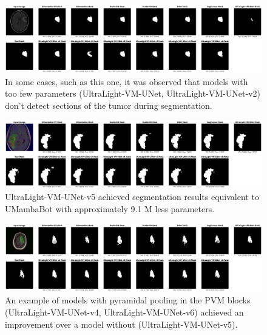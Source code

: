 \documentclass[conference]{IEEEtran}
\begin{document}
\begin{figure}[!h]
    \centering
    \includegraphics[width=\textwidth]{imgs/13_4.png}
    \caption{In some cases, such as this one, it was observed that models with too few parameters (UltraLight-VM-UNet, UltraLight-VM-UNet-v2) don't detect sections of the tumor during segmentation.}
\end{figure}

\begin{figure}[!h]
    \centering
    \includegraphics[width=\textwidth]{imgs/19_4.png}
    \caption{UltraLight-VM-UNet-v5 achieved segmentation results equivalent to UMambaBot with approximately 9.1 M less parameters.}
\end{figure}

\begin{figure}[!h]
    \centering
    \includegraphics[width=\textwidth]{imgs/0_0.png}
    \caption{An example of models with pyramidal pooling in the PVM blocks (UltraLight-VM-UNet-v4, UltraLight-VM-UNet-v6) achieved an improvement over a model without (UltraLight-VM-UNet-v5).}
\end{figure}
\end{document}

